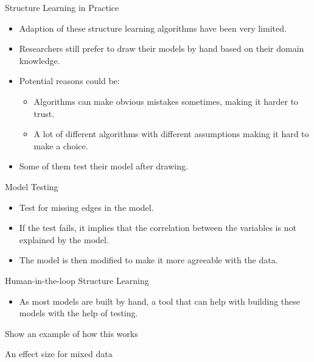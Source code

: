 \documentclass{beamer}
\begin{document}
\begin{frame}{Structure Learning in Practice}
	\begin{itemize}
		\item Adaption of these structure learning algorithms have been very limited.
		\item Researchers still prefer to draw their models by hand based on their domain knowledge.
		\item Potential reasons could be:
			\begin{itemize}
				\item Algorithms can make obvious mistakes sometimes, making it harder to trust.
				\item A lot of different algorithms with different assumptions making it hard to make a choice.
			\end{itemize}
		\item Some of them test their model after drawing.
	\end{itemize}
\end{frame}

\begin{frame}{Model Testing}

	\begin{itemize}
		\item Test for missing edges in the model.
		\item If the test fails, it implies that the correlation between the variables is not explained by the model.
		\item The model is then modified to make it more agreeable with the data.
	\end{itemize}
\end{frame}

\begin{frame}{Human-in-the-loop Structure Learning}
	\begin{itemize}
		\item As most models are built by hand, a tool that can help with building these models with the help of testing.
	\end{itemize}
\end{frame}

\begin{frame}{Show an example of how this works}
\end{frame}

\begin{frame}{An effect size for mixed data}
\end{frame}
\end{document}
